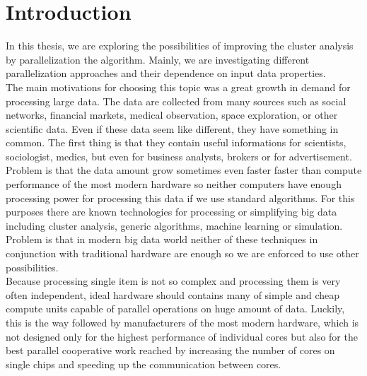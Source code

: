 \pagestyle{plain}
\setcounter{page}{1}

\chapter{Introduction}

In this thesis, we are exploring the possibilities of improving the cluster analysis by parallelization the algorithm. Mainly, we are investigating different parallelization approaches and their dependence on input data properties.\\
The main motivations for choosing this topic was a great growth in demand for processing large data. The data are collected from many sources such as social networks, financial markets, medical observation, space exploration, or other scientific data. Even if these data seem like different, they have something in common. The first thing is that they contain useful informations for scientists, sociologist, medics, but even for business analysts, brokers or for advertisement. %
\\

Problem is that the data amount grow sometimes even faster faster than compute performance of the most modern hardware so neither computers have enough processing power for processing this data if we use standard algorithms. For this purposes there are known technologies for processing or simplifying big data including cluster analysis, generic algorithms, machine learning or simulation.
Problem is that in modern big data world neither of these techniques in conjunction with traditional hardware are enough so we are enforced to use other possibilities. \\
Because processing single item is not so complex and processing them is very often independent, ideal hardware should contains many of simple and cheap compute units capable of parallel operations on huge amount of data. Luckily, this is the way followed by manufacturers of the most modern hardware, which is not designed only for the highest performance of individual cores but also for the best parallel cooperative work reached by increasing the number of cores on single chips and speeding up the communication between cores. \\

